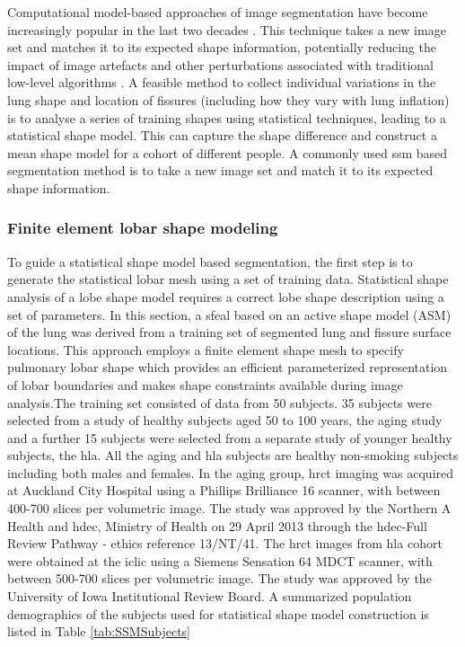 Computational model-based approaches of image segmentation have become increasingly popular in the last two decades \citep{taylor1995medical,kelemen1999elastic,tsai2003shape,okada2008automated}. This technique takes a new image set and matches it to its expected shape information, potentially reducing the impact of image artefacts and other perturbations associated with traditional low-level algorithms \citep{ecabert2008automatic,zhang2013development}. A feasible method to collect individual variations in the lung shape and location of fissures (including how they vary with lung inflation) is to analyse a series of training shapes using statistical techniques, leading to a statistical shape model. This can capture the shape difference and construct a mean shape model for a cohort of different people. A commonly used \gls{ssm} based segmentation method is to take a new image set and match it to its expected shape information. 

\subsubsection{Finite element lobar shape modeling} 

To guide a statistical shape model based segmentation, the first step is to generate the statistical lobar mesh using a set of training data. Statistical shape analysis of a lobe shape model requires a correct lobe shape description using a set of parameters. In this section, a \gls{sfeal} based on an active shape model (ASM) \citep{cootes1995active} of the lung was derived from a training set of segmented lung and fissure surface locations. This approach employs a finite element shape mesh to specify pulmonary lobar shape which provides an efficient parameterized representation of lobar boundaries and makes shape constraints available during image analysis.The training set consisted of data from 50 subjects. 35 subjects were selected from a study of healthy subjects aged 50 to 100 years, the \gls{aging} study and a further 15 subjects were selected from a separate study of younger healthy subjects, the \gls{hla}. All the \gls{aging} and \gls{hla} subjects are healthy non-smoking subjects including both males and females. In the \gls{aging} group, \gls{hrct} imaging was acquired at Auckland City Hospital using a Phillips Brilliance 16 scanner, with between 400-700 slices per volumetric image. The study was approved by the Northern A Health and \gls{hdec}, Ministry of Health on 29 April 2013 through the \gls{hdec}-Full Review Pathway - ethics reference 13/NT/41. The \gls{hrct} images from \gls{hla} cohort were obtained at the \gls{iclic} using a Siemens Sensation 64 MDCT scanner, with between 500-700 slices per volumetric image. The study was approved by the University of Iowa Institutional Review Board. A summarized population demographics of the subjects used for statistical shape model construction is listed in Table \ref{tab:SSMSubjects}

